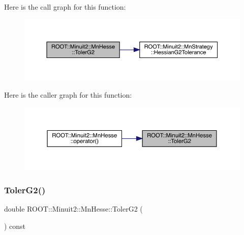 Here is the call graph for this function\+:
\nopagebreak
\begin{figure}[H]
\begin{center}
\leavevmode
\includegraphics[width=350pt]{d1/d02/classROOT_1_1Minuit2_1_1MnHesse_ae625b94360c1c974854b63aedbcc6a1a_cgraph}
\end{center}
\end{figure}
Here is the caller graph for this function\+:
\nopagebreak
\begin{figure}[H]
\begin{center}
\leavevmode
\includegraphics[width=350pt]{d1/d02/classROOT_1_1Minuit2_1_1MnHesse_ae625b94360c1c974854b63aedbcc6a1a_icgraph}
\end{center}
\end{figure}
\mbox{\label{classROOT_1_1Minuit2_1_1MnHesse_ae625b94360c1c974854b63aedbcc6a1a}} 
\subsubsection{\texorpdfstring{TolerG2()}{TolerG2()}\hspace{0.1cm}{\footnotesize\ttfamily [3/3]}}
{\footnotesize\ttfamily double R\+O\+O\+T\+::\+Minuit2\+::\+Mn\+Hesse\+::\+Toler\+G2 (\begin{DoxyParamCaption}{ }\end{DoxyParamCaption}) const\hspace{0.3cm}{\ttfamily [inline]}}


